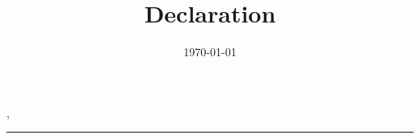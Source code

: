 \documentclass[12pt]{letter}
\title{Declaration}
\date{\today}
\begin{document}
\begin{letter}{}
\makeatletter\begin{center}\Large\textbf{\@title}\end{center}\makeatother\vspace\parskip

  

\makeatletter
  \par\nobreak\vspace{\parskip}\stopbreaks\noindent\raggedleft
  \fromaddress, \@date\\
  \vspace{2\parskip}
  \newlength\underlinelength
  \settowidth\underlinelength\fromname
  \addtolength\underlinelength{2ex}
  \rule\underlinelength\linethickness\\
  \fromname\hspace*{1ex}
\makeatother
\end{letter}
\end{document}
